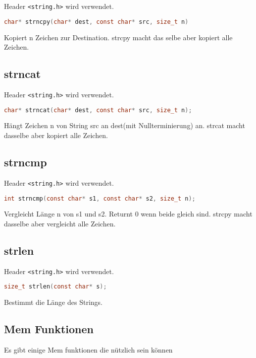 Header \verb|<string.h>| wird verwendet.\\
\begin{lstlisting}[language = c]
char* strncpy(char* dest, const char* src, size_t n)
\end{lstlisting}
Kopiert n Zeichen zur Destination. strcpy macht das selbe aber kopiert alle Zeichen. 

\subsection{strncat}

Header \verb|<string.h>| wird verwendet.\\
\begin{lstlisting}[language = c]
char* strncat(char* dest, const char* src, size_t n);
\end{lstlisting}
Hängt Zeichen n von String src an dest(mit Nullterminierung) an. strcat macht dasselbe aber kopiert alle Zeichen. 

\subsection{strncmp}

Header \verb|<string.h>| wird verwendet.\\
\begin{lstlisting}[language = c]
int strncmp(const char* s1, const char* s2, size_t n);
\end{lstlisting}
Vergleicht Länge n von s1 und s2. Returnt 0 wenn beide gleich sind. strcpy macht dasselbe aber vergleicht alle Zeichen. 

\subsection{strlen}

Header \verb|<string.h>| wird verwendet.\\
\begin{lstlisting}[language = c]
size_t strlen(const char* s);
\end{lstlisting}
Bestimmt die Länge des Strings. 

\subsection{Mem Funktionen}
Es gibt einige Mem funktionen die nützlich sein können



